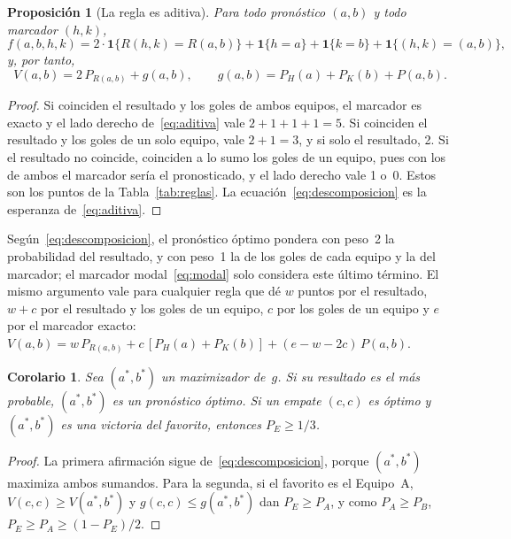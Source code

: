 \documentclass[12pt]{article}
\theoremstyle{plain}
\newtheorem{proposicion}{Proposición}
\newtheorem{corolario}{Corolario}
\theoremstyle{remark}
\begin{document}
\begin{proposicion}[La regla es aditiva]
\label{prop:aditiva}
Para todo pronóstico $(a, b)$ y todo marcador $(h, k)$,
\begin{equation}
  f(a, b, h, k) = 2 \cdot \mathbf{1}\{R(h, k) = R(a, b)\}
  + \mathbf{1}\{h = a\} + \mathbf{1}\{k = b\}
  + \mathbf{1}\{(h, k) = (a, b)\},
  \label{eq:aditiva}
\end{equation}
y, por tanto,
\begin{equation}
  V(a, b) = 2\,P_{R(a, b)} + g(a, b),
  \qquad
  g(a, b) = P_H(a) + P_K(b) + P(a, b).
  \label{eq:descomposicion}
\end{equation}
\end{proposicion}

\begin{proof}
Si coinciden el resultado y los goles de ambos equipos, el marcador
es exacto y el lado derecho de~\eqref{eq:aditiva} vale
$2 + 1 + 1 + 1 = 5$.
Si coinciden el resultado y los goles de un solo equipo, vale
$2 + 1 = 3$, y si solo el resultado, 2.
Si el resultado no coincide, coinciden a lo sumo los goles de un
equipo, pues con los de ambos el marcador sería el pronosticado, y el
lado derecho vale 1 o~0.
Estos son los puntos de la Tabla~\ref{tab:reglas}.
La ecuación~\eqref{eq:descomposicion} es la esperanza
de~\eqref{eq:aditiva}.
\end{proof}

Según~\eqref{eq:descomposicion}, el pronóstico óptimo pondera con
peso~2 la probabilidad del resultado, y con peso~1 la de los goles de
cada equipo y la del marcador; el marcador modal~\eqref{eq:modal}
solo considera este último término.
El mismo argumento vale para cualquier regla que dé $w$ puntos por el
resultado, $w + c$ por el resultado y los goles de un equipo, $c$ por
los goles de un equipo y $e$ por el marcador exacto:
$V(a, b) = w\,P_{R(a,b)} + c\,[P_H(a) + P_K(b)] + (e - w - 2c)\,P(a,b)$.

\begin{corolario}
\label{cor:g}
Sea $(a^*, b^*)$ un maximizador de~$g$.
Si su resultado es el más probable, $(a^*, b^*)$ es un pronóstico
óptimo.
Si un empate $(c, c)$ es óptimo y $(a^*, b^*)$ es una victoria del
favorito, entonces $P_E \geq 1/3$.
\end{corolario}

\begin{proof}
La primera afirmación sigue de~\eqref{eq:descomposicion}, porque
$(a^*, b^*)$ maximiza ambos sumandos.
Para la segunda, si el favorito es el Equipo~A,
$V(c, c) \geq V(a^*, b^*)$ y $g(c, c) \leq g(a^*, b^*)$ dan
$P_E \geq P_A$, y como $P_A \geq P_B$,
$P_E \geq P_A \geq (1 - P_E)/2$.
\end{proof}
\end{document}
